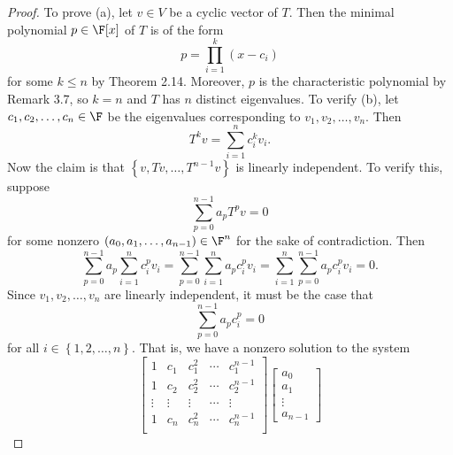 \documentclass[math_245.tex]{subfiles}
\begin{document}
    \begin{proof}
        To prove (a), let $v\in V$ be a cyclic vector of $T$. Then the minimal polynomial $p\in\F[x]$ of $T$ is of the form
        \begin{equation*}
            p = \prod^{k}_{i=1} (x-c_i)
        \end{equation*}
        for some $k\leq n$ by Theorem 2.14. Moreover, $p$ is the characteristic polynomial by Remark 3.7, so $k=n$ and $T$ has $n$ distinct eigenvalues. To verify (b), let $c_1, c_2, \ldots, c_n\in\F$ be the eigenvalues corresponding to $v_1, v_2, \ldots, v_n$. Then
        \begin{equation*}
            T^kv = \sum^{n}_{i=1} c_i^kv_i.
        \end{equation*}
        Now the claim is that $\left\lbrace v, Tv, \ldots, T^{n-1}v \right\rbrace$ is linearly independent. To verify this, suppose
        \begin{equation*}
            \sum^{n-1}_{p=0} a_pT^pv = 0
        \end{equation*}
        for some nonzero $\left( a_0, a_1, \ldots, a_{n-1} \right)\in\F^n$ for the sake of contradiction. Then
        \begin{equation*}
            \sum^{n-1}_{p=0} a_p \sum^{n}_{i=1} c_i^pv_i = \sum^{n-1}_{p=0} \sum^{n}_{i=1} a_pc_i^pv_i = \sum^{n}_{i=1} \sum^{n-1}_{p=0} a_pc_i^pv_i = 0.
        \end{equation*}
        Since $v_1, v_2, \ldots, v_n$ are linearly independent, it must be the case that
        \begin{equation*}
            \sum^{n-1}_{p=0} a_pc_i^p = 0
        \end{equation*}
        for all $i\in \left\lbrace 1, 2, \ldots, n \right\rbrace$. That is, we have a nonzero solution to the system
        \begin{equation*}
            \begin{bmatrix}
                1 & c_1 & c_1^2 & \cdots & c_1^{n-1} \\
                1 & c_2 & c_2^2 & \cdots & c_2^{n-1} \\
                \vdots & \vdots & \vdots & \cdots & \vdots \\
                1 & c_n & c_n^2 & \cdots & c_n^{n-1} \\
            \end{bmatrix}
            \begin{bmatrix}
                a_0 \\ a_1 \\ \vdots \\ a_{n-1}

\end{bmatrix}
\end{equation*}
\end{proof}
\end{document}
